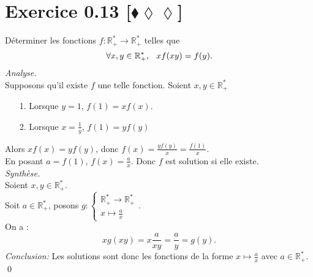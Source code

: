 \documentclass[10pt]{article}
\begin{document}
\section*{Exercice 0.13 [$\blacklozenge\lozenge\lozenge$]}
\begin{tcolorbox}[enhanced, width=7in, center, size=fbox, fontupper=\large, drop shadow southwest]
    Déterminer les fonctions $f: \mathbb{R}_+^* \rightarrow \mathbb{R}_+^*$ telles que 
    \begin{equation*}
        \forall{x,y\in\mathbb{R}^*_+}, \hspace{0.25cm} xf(xy) = f(y).
    \end{equation*}
    \emph{Analyse.}\\
    Supposons qu'il existe $f$ une telle fonction. Soient $x,y\in\mathbb{R}^*_+$
    \begin{itemize}
        \item[1.] Lorsque $y=1$, $f(1)=xf(x)$.
        \item[2.] Lorsque $x=\frac{1}{y}$, $f(1)=yf(y)$
    \end{itemize}
    Alors $xf(x)=yf(y)$, donc $f(x)=\frac{yf(y)}{x}=\frac{f(1)}{x}$.\\
    En posant $a=f(1)$, $f(x)=\frac{a}{x}$.
    Donc $f$ est solution si elle existe.\\[0.2cm]
    \emph{Synthèse.}\\
    Soient $x,y\in\mathbb{R}^*_+$.\\
    Soit $a\in\mathbb{R^*_+}$, posons $g:\begin{cases}\mathbb{R}^*_+\rightarrow\mathbb{R}^*_+\\x\mapsto\frac{a}{x}\end{cases}$.\\
    On a :
    \begin{equation*}
        xg(xy)=x\frac{a}{xy}=\frac{a}{y}=g(y).
    \end{equation*}
    \emph{Conclusion:}
    Les solutions sont donc les fonctions de la forme $x\mapsto\frac{a}{x}$ avec $a\in\mathbb{R^*_+}$.\\
    \qed
\end{tcolorbox}
\end{document}

